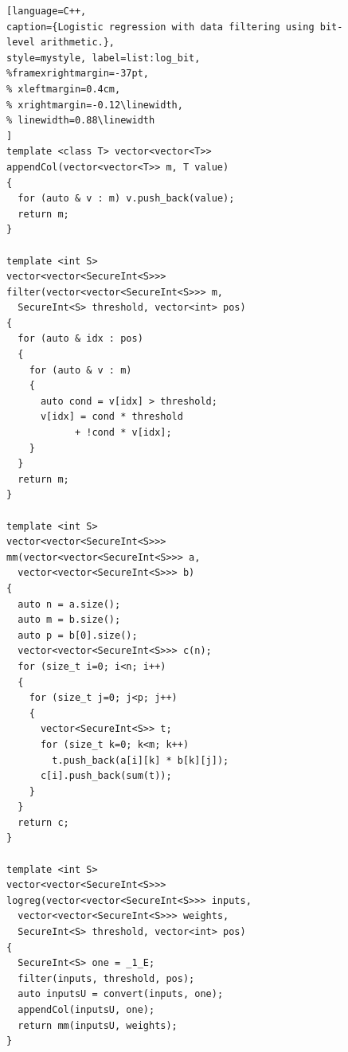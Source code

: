 \begin{figure}[t]
\begin{minipage}{\linewidth}
\begin{lstlisting}[language=C++,
caption={Logistic regression with data filtering using bit-level arithmetic.},
style=mystyle, label=list:log_bit,
%framexrightmargin=-37pt,
% xleftmargin=0.4cm,
% xrightmargin=-0.12\linewidth,
% linewidth=0.88\linewidth
]
template <class T> vector<vector<T>>
appendCol(vector<vector<T>> m, T value)
{
  for (auto & v : m) v.push_back(value);
  return m;
}

template <int S>
vector<vector<SecureInt<S>>>
filter(vector<vector<SecureInt<S>>> m,
  SecureInt<S> threshold, vector<int> pos)
{
  for (auto & idx : pos)
  {
    for (auto & v : m)
    {
      auto cond = v[idx] > threshold;
      v[idx] = cond * threshold
            + !cond * v[idx];
    }
  }
  return m;
}

template <int S>
vector<vector<SecureInt<S>>>
mm(vector<vector<SecureInt<S>>> a,
  vector<vector<SecureInt<S>>> b)
{
  auto n = a.size();
  auto m = b.size();
  auto p = b[0].size();
  vector<vector<SecureInt<S>>> c(n);
  for (size_t i=0; i<n; i++)
  {
    for (size_t j=0; j<p; j++)
    {
      vector<SecureInt<S>> t;
      for (size_t k=0; k<m; k++)
        t.push_back(a[i][k] * b[k][j]);
      c[i].push_back(sum(t));
    }
  }
  return c;
}

template <int S>
vector<vector<SecureInt<S>>>
logreg(vector<vector<SecureInt<S>>> inputs,
  vector<vector<SecureInt<S>>> weights,
  SecureInt<S> threshold, vector<int> pos)
{
  SecureInt<S> one = _1_E;
  filter(inputs, threshold, pos);
  auto inputsU = convert(inputs, one);
  appendCol(inputsU, one);
  return mm(inputsU, weights);
}
\end{lstlisting}
\end{minipage}
\end{figure}

